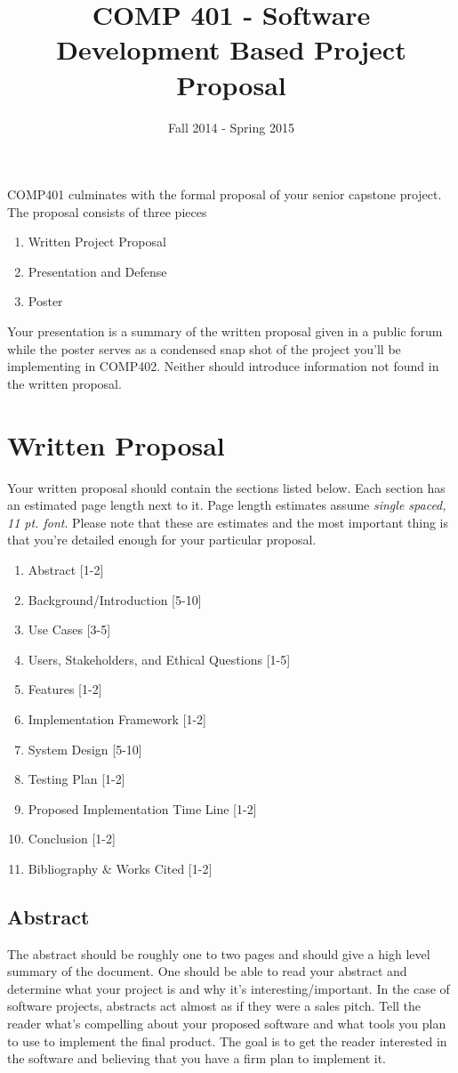 \documentclass[10pt]{article}
\title{COMP 401 - Software Development Based Project Proposal}
\author{  }
\date{Fall 2014 - Spring 2015}
\begin{document}
\maketitle

COMP401 culminates with the formal proposal of your senior capstone project.  The proposal consists of three pieces
\begin{enumerate}
\item Written Project Proposal
\item Presentation and Defense 
\item Poster
\end{enumerate}
Your presentation is a summary of the written proposal given in a public forum while the poster serves as a condensed snap shot of the project you'll be implementing in COMP402.  Neither should introduce information not found in the written proposal.

\section{Written Proposal}

Your written proposal should contain the sections listed below.  Each section has an estimated page length next to it.  Page length estimates assume \textit{single spaced, 11 pt. font}.  Please note that these are estimates and the most important thing is that you're detailed enough for your particular proposal.   
\begin{enumerate}
\item Abstract [1-2]
\item Background/Introduction [5-10]
\item Use Cases [3-5]
\item Users, Stakeholders, and Ethical Questions [1-5]
\item Features [1-2]
\item Implementation Framework [1-2]
\item System Design [5-10]
\item Testing Plan [1-2]
\item Proposed Implementation Time Line [1-2]
\item Conclusion [1-2]
\item Bibliography \& Works Cited [1-2]
\end{enumerate}

\subsection{Abstract}
The abstract should be roughly one to two pages and should give a high level summary of the document.  One should be able to read your abstract and determine what your project is and why it's interesting/important.  In the case of software projects, abstracts act almost as if they were a sales pitch.  Tell the reader what's compelling about your proposed software and what tools you plan to use to implement the final product.  The goal is to get the reader interested in the software and believing that you have a firm plan to implement it.  
\end{document}
